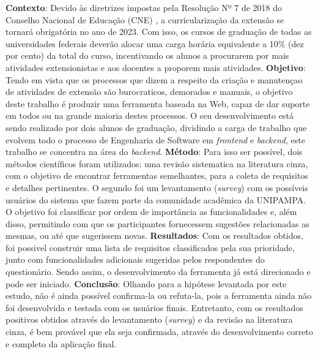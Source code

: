 \begin{resumo}

\textbf{Contexto}: Devido às diretrizes impostas pela Resolução Nº 7 de 2018 do Conselho Nacional de Educação (CNE) \cite{Resolucao-MEC:2018}, a curricularização da extensão se tornará obrigatória no ano de 2023. Com isso, os cursos de graduação de todas as universidades federais deverão alocar uma carga horária equivalente a 10\% (dez por cento) da total do curso, incentivando os alunos a procurarem por mais atividades extensionistas e aos docentes a proporem mais atividades.
\textbf{Objetivo}: Tendo em vista que os processos que dizem a respeito da criação e manutençao de atividades de extensão são burocraticos, demorados e manuais, o objetivo deste trabalho é produzir uma ferramenta baseada na Web, capaz de dar suporte em todos ou na grande maioria destes processos. O seu desenvolvimento está sendo realizado por dois alunos de graduação, dividindo a carga de trabalho que evolvem todo o processo de Engenharia de Software em \textit{frontend} e \textit{backend}, este trabalho se concentra na área do \textit{backend}.
\textbf{Método}: Para isso ser possível, dois métodos científicos foram utilizados:
uma revisão sistematica na literatura cinza, com o objetivo de encontrar ferramentas semelhantes, para a coleta de requisitos e detalhes pertinentes. O segundo foi um levantamento (\textit{survey}) com os possíveis usuários do sistema que fazem parte da comunidade acadêmica da UNIPAMPA. O objetivo foi classificar por ordem de importância as funcionalidades e, além disso, permitindo com que os participantes fornecessem sugestões relacionadas as mesmas, ou até que sugerissem novas. 
\textbf{Resultados}: Com os resultados obtidos, foi possivel construir uma lista de requisitos classificados pela sua prioridade, junto com funcionalidades adicionais sugeridas pelos respondentes do questionário. Sendo assim, o desenvolvimento da ferramenta já está direcionado e pode ser iniciado.
\textbf{Conclusão}: Olhando para a hipótese levantada por este estudo, não é ainda possível confirma-la ou refuta-la, pois a ferramenta ainda não foi desenvolvida e testada com os usuários finais. Entretanto, com os resultados positivos obtidos através do levantamento (\textit{survey}) e da revisão na literatura cinza, é bem provável que ela seja confirmada, através do desenvolvimento correto e completo da aplicação final.


\end{resumo}
